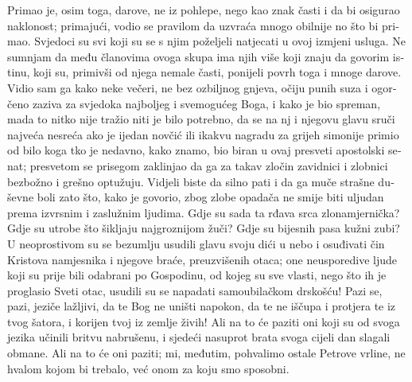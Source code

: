 \documentclass[a5paper,twoside]{article}
\begin{document}
\begin{pages}
\begin{Rightside}
\begin{croatian}
\pend
\pstart
Primao je, osim toga, darove, ne iz pohlepe, nego kao znak časti i da bi osigurao naklonost; primajući, vodio se pravilom da uzvraća mnogo obilnije no što bi primao.  Svjedoci su svi koji su se s njim poželjeli natjecati u ovoj izmjeni usluga.  Ne sumnjam da među članovima ovoga skupa ima njih više koji znaju da govorim istinu, koji su, primivši od njega nemale časti, ponijeli povrh toga i mnoge darove.
\pend
\pstart
Vidio sam ga kako neke večeri, ne bez ozbiljnog gnjeva, očiju punih suza i ogorčeno zaziva za svjedoka najboljeg i svemogućeg Boga, i kako je bio spreman, mada to nitko nije tražio niti je bilo potrebno, da se na nj i njegovu glavu sruči najveća nesreća ako je ijedan novčić ili ikakvu nagradu za grijeh simonije primio od bilo koga tko je nedavno, kako znamo, bio biran u ovaj presveti apostolski senat; presvetom se prisegom zaklinjao da ga za takav zločin zavidnici i zlobnici bezbožno i grešno optužuju.  Vidjeli biste da silno pati i da ga muče strašne duševne boli zato što, kako je govorio, zbog zlobe opadača ne smije biti uljudan prema izvrsnim i zaslužnim ljudima.
\pend
\pstart
Gdje su sada ta rđava srca zlonamjernička?  Gdje su utrobe što šikljaju najgroznijom žuči?  Gdje su bijesnih pasa kužni zubi?  U neoprostivom su se bezumlju usudili glavu svoju dići u nebo i osuđivati čin Kristova namjesnika i njegove braće, preuzvišenih otaca; one neusporedive ljude koji su prije bili odabrani po Gospodinu, od kojeg su sve vlasti, nego što ih je proglasio Sveti otac, usudili su se napadati samoubilačkom drskošću!  Pazi se, pazi, jeziče lažljivi, da te Bog ne uništi napokon, da te ne iščupa i protjera te iz tvog šatora, i korijen tvoj iz zemlje živih! Ali na to će paziti oni koji su od svoga jezika učinili britvu nabrušenu, i sjedeći nasuprot brata svoga cijeli dan slagali obmane. Ali na to će oni paziti; mi, međutim, pohvalimo ostale Petrove vrline, ne hvalom kojom bi trebalo, već onom za koju smo sposobni.  
\pend
\pstart

\end{croatian}
\end{Rightside}
\end{pages}
\end{document}
